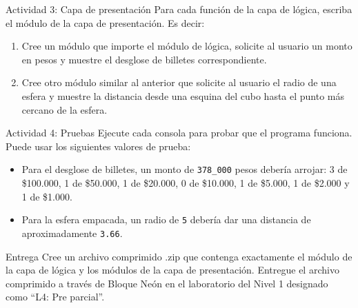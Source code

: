 \documentclass{ip-lab}
\begin{document}
\pagebreak

\begin{sectionbox}{Actividad 3: Capa de presentación}
Para cada función de la capa de lógica, escriba el módulo de la capa de presentación. Es decir:
\begin{enumerate}
    \item Cree un módulo que importe el módulo de lógica, solicite al usuario un monto en pesos y muestre el desglose de billetes correspondiente.
    \item Cree otro módulo similar al anterior que solicite al usuario el radio de una esfera y muestre la distancia desde una esquina del cubo hasta el punto más cercano de la esfera.
\end{enumerate}
\end{sectionbox}

\begin{sectionbox}{Actividad 4: Pruebas}
Ejecute cada consola para probar que el programa funciona. Puede usar los siguientes valores de prueba:
\begin{itemize}
  \item Para el desglose de billetes, un monto de \verb|378_000| pesos debería arrojar: 3 de \$100.000, 1 de \$50.000, 1 de \$20.000, 0 de \$10.000, 1 de \$5.000, 1 de \$2.000 y 1 de \$1.000.
  \item Para la esfera empacada, un radio de \verb|5| debería dar una distancia de aproximadamente \verb|3.66|.
\end{itemize}
\end{sectionbox}

\begin{sectionbox}{Entrega}
  Cree un archivo comprimido .zip que contenga exactamente el módulo de la capa de lógica y los módulos de la capa de presentación. Entregue el archivo comprimido a través de Bloque Neón en el laboratorio del Nivel 1 designado como ``L4: Pre parcial''.
\end{sectionbox}
\end{document}
